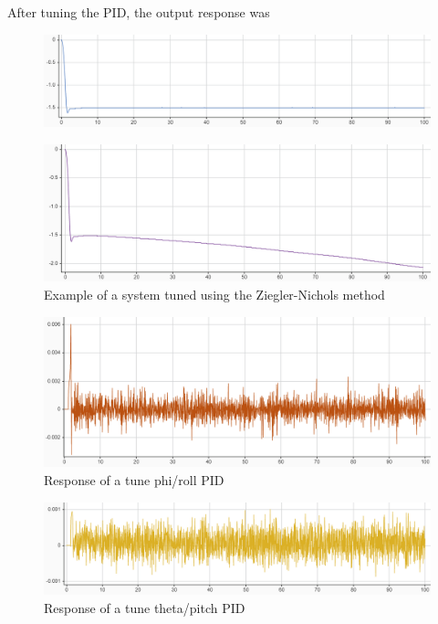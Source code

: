 After tuning the PID, the output response was
\begin{figure}[H]
    \begin{center}
    \includegraphics[scale=0.7]{pictures/control/zpidnonoise}
    \end{center}
    \caption{}
    \label{fig:zpidnonoise}
\end{figure}

\begin{figure}[H]
    \begin{center}
    \includegraphics[scale=0.7]{pictures/control/zpidnoise}
    \end{center}
    \caption{Example of a system tuned using the Ziegler-Nichols method\cite{LibrePID}}
    \label{fig:zpidnoise}
\end{figure}

\begin{figure}[H]
    \begin{center}
    \includegraphics[scale=0.7]{pictures/control/phiPID.PNG}
    \end{center}
    \caption{Response of a tune phi/roll PID}
    \label{fig:phipid}
\end{figure}

\begin{figure}[H]
    \begin{center}
    \includegraphics[scale=0.7]{pictures/control/thetaPID.PNG}
    \end{center}
    \caption{Response of a tune theta/pitch PID}
    \label{fig:thetapid}
\end{figure}